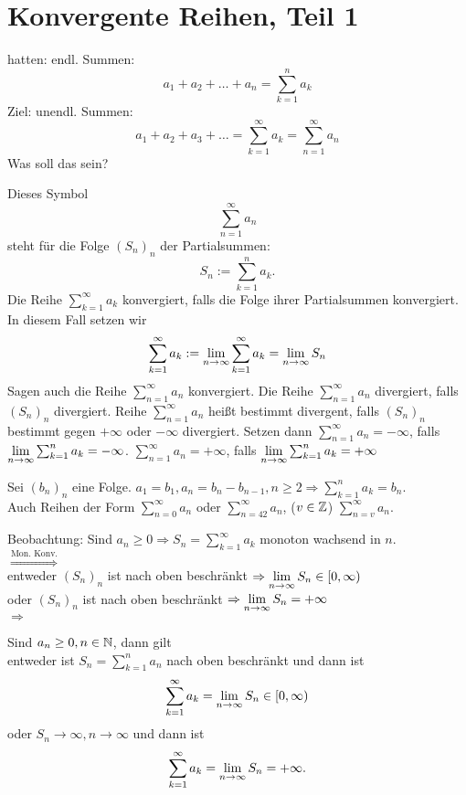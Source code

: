 \documentclass[../ana1.tex]{subfiles}
\begin{document}
\section{Konvergente Reihen, Teil 1}
hatten: endl. Summen: \[ a_1+a_2+\dots+a_n = \sum_{k=1}^{n}a_k \]
Ziel: unendl. Summen: \[ a_1+a_2+a_3+\dots = \sum_{k=1}^{\infty}a_k = \sum_{n=1}^{\infty}a_n \]
Was soll das sein?
\begin{defi}
	Dieses Symbol \[ \sum_{n=1}^{\infty}a_n \] steht für die Folge \((S_n)_n\) der Partialsummen: \[S_n := \sum_{k=1}^{n}a_k .\]
	Die Reihe \( \sum_{k=1}^{\infty}a_k \) konvergiert, falls die Folge ihrer Partialsummen konvergiert. In diesem Fall setzen wir 
	\[ \sum_{k=1}^{\infty}a_k := \lim\limits_{n\rightarrow\infty} \sum_{k=1}^{\infty}a_k = \lim\limits_{n\rightarrow\infty} S_n \]
	Sagen auch die Reihe \( \sum_{n=1}^{\infty}a_n \) konvergiert. Die Reihe \( \sum_{n=1}^{\infty}a_n \) divergiert, falls \( (S_n)_n \) divergiert. Reihe \( \sum_{n=1}^{\infty}a_n \) heißt bestimmt divergent, falls \((S_n)_n\) bestimmt gegen \(+ \infty \) oder \(-\infty\) divergiert. Setzen dann \( \sum_{n=1}^{\infty}a_n =-\infty \), falls \(\lim\limits_{n\rightarrow\infty} \sum_{k=1}^{n}a_k = -\infty \). \( \sum_{n=1}^{\infty}a_n = +\infty \), falls \( \lim\limits_{n\rightarrow\infty}\sum_{k=1}^{n}a_k=+\infty \)
\end{defi}
\begin{bem}
	Sei \((b_n)_n\) eine Folge. \(a_1 = b_1, a_n = b_n-b_{n-1}, n\geq 2 \Rightarrow \sum_{k=1}^{n}a_k = b_n \).\\
	Auch Reihen der Form \( \sum_{n=0}^{\infty}a_n \) oder \( \sum_{n=42}^{\infty}a_n\), (\(v\in\mathbb{Z}\)) \(\sum_{n=v}^{\infty}a_n\).
\end{bem}
Beobachtung: Sind \(a_n \geq 0 \Rightarrow S_n = \sum_{k=1}^{\infty}a_k \) monoton wachsend in \(n\).\\
\( \overset{\text{Mon. Konv.}}{\Rightarrow}\)\\
entweder \((S_n)_n\) ist nach oben beschränkt \( \Rightarrow \lim\limits_{n\rightarrow\infty} S_n \in [0,\infty) \)\\
oder \((S_n)_n\) ist nach oben beschränkt \( \Rightarrow \lim\limits_{n\rightarrow\infty} S_n  = +\infty \)\\
\( \Rightarrow \)
\begin{satz}
	Sind \(a_n \geq 0, n\in\mathbb{N} \), dann gilt\\
	entweder ist \(S_n = \sum_{k=1}^{n}a_n\) nach oben beschränkt und dann ist \[ \sum_{k=1}^{\infty}a_k = \lim\limits_{n\rightarrow\infty}S_n \in [0,\infty) \]
	oder \(S_n \rightarrow \infty, n\rightarrow\infty \) und dann ist \[ \sum_{k=1}^{\infty}a_k = \lim\limits_{n\rightarrow\infty}S_n = +\infty. \]
\end{satz}
\end{document}
